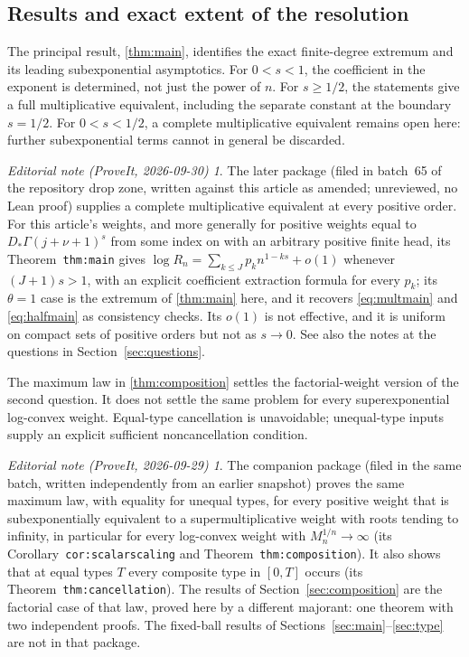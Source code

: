 \documentclass[11pt,a4paper]{article}
\theoremstyle{definition}
\theoremstyle{remark}
\newtheorem*{ednote}{Editorial note (ProveIt, 2026-09-29)}
\newtheorem*{ednotelater}{Editorial note (ProveIt, 2026-09-30)}
\numberwithin{equation}{section}
\begin{document}
\subsection{Results and exact extent of the resolution}
The principal result, \cref{thm:main}, identifies the exact finite-degree
extremum and its leading subexponential asymptotics. For $0<s<1$, the
coefficient in the exponent is determined, not just the power of $n$.
For $s\ge1/2$, the statements give a full multiplicative equivalent,
including the separate constant at the boundary $s=1/2$. For $0<s<1/2$,
a complete multiplicative equivalent remains open here: further
subexponential terms cannot in general be discarded.
\begin{ednotelater}
The later package 
(filed in batch~65 of the repository drop zone, written against this
article as amended; unreviewed, no Lean proof) supplies a complete
multiplicative equivalent at every positive order. For this article's
weights, and more generally for positive weights equal to
$D_*\Gamma(j+\nu+1)^s$ from some index on with an arbitrary positive finite
head, its Theorem~\texttt{thm:main} gives
$\log R_n=\sum_{k\le J}p_kn^{1-ks}+o(1)$ whenever $(J+1)s>1$, with an
explicit coefficient extraction formula for every $p_k$; its $\theta=1$
case is the extremum of \cref{thm:main} here, and it recovers
\eqref{eq:multmain} and \eqref{eq:halfmain} as consistency checks. Its
$o(1)$ is not effective, and it is uniform on compact sets of positive
orders but not as $s\to0$. See also the notes at the questions in
Section~\ref{sec:questions}.
\end{ednotelater}

The maximum law in \cref{thm:composition} settles the factorial-weight
version of the second question. It does not settle the same problem for
every superexponential log-convex weight. Equal-type cancellation is
unavoidable; unequal-type inputs supply an explicit sufficient
noncancellation condition.
\begin{ednote}
The companion package 
(filed in the same batch, written independently from an earlier snapshot)
proves the same maximum law, with equality for unequal types, for every
positive weight that is subexponentially equivalent to a supermultiplicative
weight with roots tending to infinity, in particular for every log-convex
weight with $M_n^{1/n}\to\infty$ (its Corollary~\texttt{cor:scalarscaling}
and Theorem~\texttt{thm:composition}). It also shows that at equal types $T$
every composite type in $[0,T]$ occurs (its
Theorem~\texttt{thm:cancellation}). The results of
Section~\ref{sec:composition} are the factorial case of that law, proved
here by a different majorant: one theorem with two independent proofs. The
fixed-ball results of Sections~\ref{sec:main}--\ref{sec:type} are not in
that package.
\end{ednote}
\end{document}
